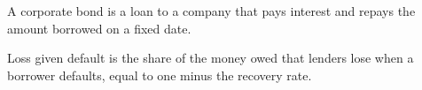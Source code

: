 \begin{keyterms}
\small
\begin{description}[leftmargin=0pt, itemsep=2pt, parsep=0pt, font=\normalfont\bfseries\color{FEMaroon}]
  \item[Corporate bond.] A corporate bond is a loan to a company that pays interest and repays the amount borrowed on a fixed date.
  \item[Loss given default.] Loss given default is the share of the money owed that lenders lose when a borrower defaults, equal to one minus the recovery rate.
\end{description}
\end{keyterms}
